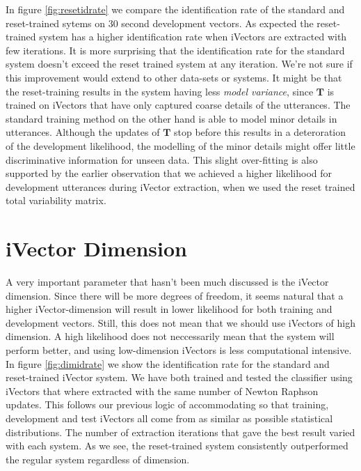 In figure \ref{fig:resetidrate} we compare the identification rate of the standard and reset-trained sytems on 30 second development vectors. As expected the reset-trained system has a higher identification rate when iVectors are extracted with few iterations. It is more surprising that the identification rate for the standard system doesn't exceed the reset trained system at any iteration. We're not sure if this improvement would extend to other data-sets or systems. It might be that the reset-training results in the system having less \emph{model variance}, since $\mathbf{T}$ is trained on iVectors that have only captured coarse details of the utterances. The standard training method on the other hand is able to model minor details in utterances. Although the updates of $\mathbf{T}$ stop before this results in a deteroration of the development likelihood, the modelling of the minor details might offer little discriminative information for unseen data. This slight over-fitting is also supported by the earlier observation that we achieved a higher likelihood for development utterances during iVector extraction, when we used the reset trained total variability matrix.

\section{iVector Dimension}
\label{sect:ivectdimtests}

A very important parameter that hasn't been much discussed is the iVector dimension. Since there will be more degrees of freedom, it seems natural that a higher iVector-dimension will result in lower likelihood for both training and development vectors. Still, this does not mean that we should use iVectors of high dimension. A high likelihood does not neccessarily mean that the system will perform better, and using low-dimension iVectors is less computational intensive.  In figure \ref{fig:dimidrate} we show the identification rate for the standard and reset-trained iVector system. We have both trained and tested the classifier using iVectors that where extracted with the same number of Newton Raphson updates. This follows our previous logic of accommodating so that training, development and test iVectors all come from as similar as possible statistical distributions. The number of extraction iterations that gave the best result varied with each system. As we see, the reset-trained system consistently outperformed the regular system regardless of dimension.

